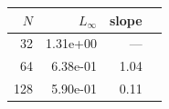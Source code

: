 \begin{tabular}{rrrr}
\toprule
$N$ & $L_\infty$ & slope \\
\midrule
32 & 1.31e+00 & --- \\
64 & 6.38e-01 & 1.04 \\
128 & 5.90e-01 & 0.11 \\
\bottomrule
\end{tabular}
